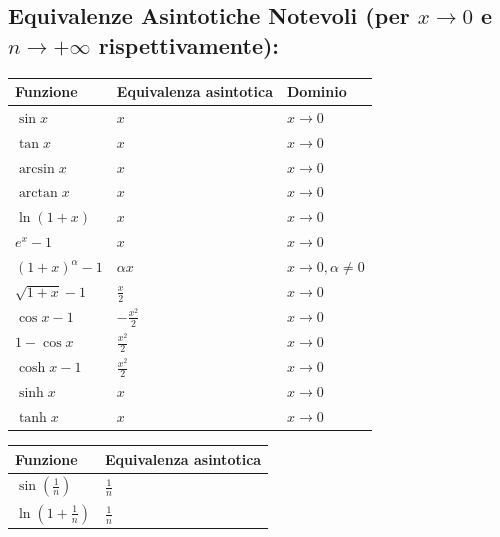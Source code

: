 \documentclass[10pt, a4paper]{article}
\begin{document}
    \subsection{Equivalenze Asintotiche Notevoli (per $x \to 0$ e $n \to +\infty$ rispettivamente):}
        \begin{center}
            \begin{tabular}{|lll|}
                \hline
                \textbf{Funzione} & \textbf{Equivalenza asintotica} & \textbf{Dominio}\\
                \hline
                $\sin x$ & $x$ & $x \to 0$ \\
                \hline
                $\tan x$ & $x$ & $x \to 0$ \\
                \hline
                $\arcsin x$ & $x$ & $x \to 0$ \\
                \hline
                $\arctan x$ & $x$ & $x \to 0$ \\
                \hline
                $\ln(1+x)$ & $x$ & $x \to 0$ \\
                \hline
                $e^x - 1$ & $x$ & $x \to 0$ \\
                \hline
                $(1+x)^\alpha - 1$ & $\alpha x$ & $x \to 0, \alpha \neq 0$ \\
                \hline
                $\sqrt{1+x} - 1$ & $\frac{x}{2}$ & $x \to 0$ \\
                \hline
                $\cos x - 1$ & $-\frac{x^2}{2}$ & $x \to 0$ \\
                \hline
                $1 - \cos x$ & $\frac{x^2}{2}$ & $x \to 0$ \\
                \hline
                $\cosh x - 1$ & $\frac{x^2}{2}$ & $x \to 0$ \\
                \hline
                $\sinh x$ & $x$ & $x \to 0$ \\
                \hline
                $\tanh x$ & $x$ & $x \to 0$ \\
                \hline
            \end{tabular}
            \begin{tabular}{|ll|}
                \hline
                \textbf{Funzione} & \textbf{Equivalenza asintotica} \\
                \hline
                $\displaystyle\sin\left(\frac{1}{n}\right)$ & $\displaystyle\frac{1}{n}$ \\
                \hline
                $\displaystyle\ln\left(1+\frac{1}{n}\right)$ & $\displaystyle\frac{1}{n}$ \\

\end{tabular}
\end{center}
\end{document}
